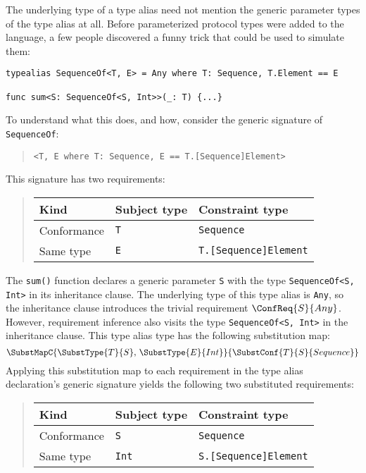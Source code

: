 \documentclass[../generics]{subfiles}
\begin{document}
\begin{example}
The underlying type of a type alias need not mention the generic parameter types of the type alias at all. Before parameterized protocol types were added to the language, a few people discovered a funny trick that could be used to simulate them:
\begin{Verbatim}
typealias SequenceOf<T, E> = Any where T: Sequence, T.Element == E

func sum<S: SequenceOf<S, Int>>(_: T) {...}
\end{Verbatim}
To understand what this does, and how, consider the generic signature of \texttt{SequenceOf}:
\begin{quote}
\begin{verbatim}
<T, E where T: Sequence, E == T.[Sequence]Element>
\end{verbatim}
\end{quote}
This signature has two requirements:
\begin{quote}
\begin{tabular}{lll}
\toprule
\textbf{Kind}&\textbf{Subject type}&\textbf{Constraint type}\\
\midrule
Conformance&\texttt{T}&\texttt{Sequence}\\
Same type&\texttt{E}&\texttt{T.[Sequence]Element}\\
\bottomrule
\end{tabular}
\end{quote}
The \texttt{sum()} function declares a generic parameter \texttt{S} with the type \texttt{SequenceOf<S, Int>} in its inheritance clause. The underlying type of this type alias is \texttt{Any}, so the inheritance clause introduces the trivial requirement $\ConfReq{S}{Any}$. However, requirement inference also visits the type \texttt{SequenceOf<S, Int>} in the inheritance clause. This type alias type has the following substitution map:
\[
\SubstMapC{
\SubstType{T}{S},\,\SubstType{E}{Int}
}{\SubstConf{T}{S}{Sequence}}
\]
Applying this substitution map to each requirement in the type alias declaration's generic signature yields the following two substituted requirements:
\begin{quote}
\begin{tabular}{lll}
\toprule
\textbf{Kind}&\textbf{Subject type}&\textbf{Constraint type}\\
\midrule
Conformance&\texttt{S}&\texttt{Sequence}\\
Same type&\texttt{Int}&\texttt{S.[Sequence]Element}\\

\end{tabular}
\end{quote}
\end{example}
\end{document}
